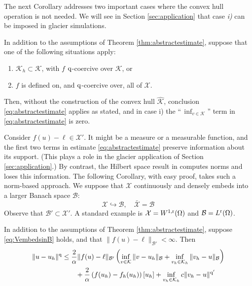 \documentclass[hidelinks,onefignum,onetabnum,final]{siamart220329}  %
\newcommand{\cB}{\mathcal{B}}
\newcommand{\cK}{\mathcal{K}}
\newcommand{\cX}{\mathcal{X}}
\newcommand{\hcK}{\widehat{\cK}}
\newcommand{\qq}{{\text{\textnormal{q}}}}
\newcommand{\rr}{{\text{\textnormal{r}}}}
\begin{document}
The next Corollary addresses two important cases where the convex hull operation is not needed.  We will see in Section \ref{sec:application} that case \emph{i)} can be imposed in glacier simulations.

\begin{corollary}  \label{cor:abstractestimate:nohull}  In addition to the assumptions of Theorem \ref{thm:abstractestimate}, suppose that one of the following situations apply:
\renewcommand{\labelenumi}{\roman{enumi})}
\begin{enumerate}
\item $\cK_h \subset \cK$, with $f$ $\qq$-coercive over $\cK$, or
\item $f$ is defined on, and $\qq$-coercive over, all of $\cX$.
\end{enumerate}
Then, without the construction of the convex hull $\hcK$, conclusion \eqref{eq:abstractestimate} applies as stated, and in case i) the ``\,$\inf_{v\in\cK}$'' term in \eqref{eq:abstractestimate} is zero.
\end{corollary}

Consider $f(u)-\ell\in \cX'$.  It might be a measure or a measurable function, and the first two terms in estimate \eqref{eq:abstractestimate} preserve information about its support.  (This plays a role in the glacier application of Section \ref{sec:application}.)  By contrast, the Hilbert space result in \cite{Falk1974} computes norms and loses this information.  The following Corollary, with easy proof, takes such a norm-based approach.  We suppose that $\cX$ continuously and densely embeds into a larger Banach space $\cB$:
\begin{equation}
\cX \hookrightarrow \cB, \quad \bar{\cX} = \cB \label{eq:VembedsinB}
\end{equation}
Observe that $\cB' \subset \cX'$.  A standard example is $\cX=W^{1,\rr}(\Omega)$ and $\cB=L^\rr(\Omega)$.

\begin{corollary}  \label{cor:abstractestimate:Bnorm}  In addition to the assumptions of Theorem \ref{thm:abstractestimate}, suppose \eqref{eq:VembedsinB} holds, and that $\|f(u)-\ell\|_{\cB'} < \infty$.  Then
\begin{align}
\|u-u_h\|^\qq &\le \frac{2}{\alpha} \|f(u)-\ell\|_{\cB'} \left( \inf_{v\in\cK} \|v-u_h\|_{\cB} +   \inf_{v_h\in\cK_h} \|v_h-u\|_{\cB} \right) \label{eq:abstractestimate:Bnorm} \\
   &\qquad + \frac{2}{\alpha} \left(f(u_h)-f_h(u_h)\right)[u_h] + \inf_{v_h\in\cK_h} c \|v_h - u\|^{\qq'} \notag
\end{align}
\end{corollary}
\end{document}
